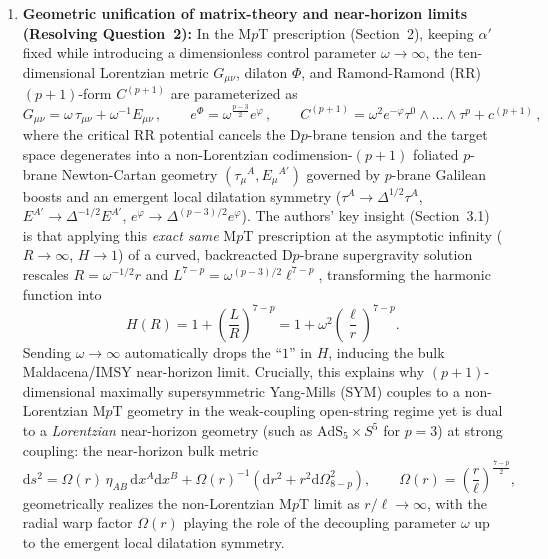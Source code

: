 \documentclass[11pt,a4paper]{article}
\newcommand{\dd}{\mathrm{d}}
\begin{document}
\begin{enumerate}[label=(\alph*), leftmargin=1.8em]
    \item \textbf{Geometric unification of matrix-theory and near-horizon limits (Resolving Question~2):}
    In the M$p$T prescription (Section~2), keeping $\alpha'$ fixed while introducing a dimensionless control parameter $\omega \to \infty$, the ten-dimensional Lorentzian metric $G_{\mu\nu}$, dilaton $\Phi$, and Ramond-Ramond (RR) $(p+1)$-form $C^{(p+1)}$ are parameterized as
    \begin{equation}
        G_{\mu\nu} = \omega\,\tau_{\mu\nu} + \omega^{-1} E_{\mu\nu}\,, \qquad
        e^\Phi = \omega^{\frac{p-3}{2}} e^\varphi\,, \qquad
        C^{(p+1)} = \omega^2 e^{-\varphi} \tau^0 \wedge \dots \wedge \tau^p + c^{(p+1)}\,,
        \label{eq:MpT_def}
    \end{equation}
    where the critical RR potential cancels the D$p$-brane tension and the target space degenerates into a non-Lorentzian codimension-$(p+1)$ foliated $p$-brane Newton-Cartan geometry $(\tau_\mu{}^A, E_\mu{}^{A'})$ governed by $p$-brane Galilean boosts and an emergent local dilatation symmetry ($\tau^A \to \Delta^{1/2}\tau^A$, $E^{A'} \to \Delta^{-1/2}E^{A'}$, $e^\varphi \to \Delta^{(p-3)/2}e^\varphi$). The authors' key insight (Section~3.1) is that applying this \emph{exact same} M$p$T prescription at the asymptotic infinity ($R \to \infty$, $H \to 1$) of a curved, backreacted D$p$-brane supergravity solution rescales $R = \omega^{-1/2}r$ and $L^{7-p} = \omega^{(p-3)/2}\ell^{7-p}$, transforming the harmonic function into
    \begin{equation}
        H(R) = 1 + \left(\frac{L}{R}\right)^{\!7-p} = 1 + \omega^2 \left(\frac{\ell}{r}\right)^{\!7-p}.
    \end{equation}
    Sending $\omega \to \infty$ automatically drops the ``$1$'' in $H$, inducing the bulk Maldacena/IMSY near-horizon limit. Crucially, this explains why $(p+1)$-dimensional maximally supersymmetric Yang-Mills (SYM) couples to a non-Lorentzian M$p$T geometry in the weak-coupling open-string regime yet is dual to a \emph{Lorentzian} near-horizon geometry (such as $\text{AdS}_5 \times S^5$ for $p=3$) at strong coupling: the near-horizon bulk metric
    \begin{equation}
        \dd s^2 = \mathbb{\Omega}(r)\,\eta_{AB}\,\dd x^A \dd x^B + \mathbb{\Omega}(r)^{-1}\left(\dd r^2 + r^2 \dd\Omega_{8-p}^2\right), \qquad \mathbb{\Omega}(r) = \left(\frac{r}{\ell}\right)^{\!\frac{7-p}{2}},
        \label{eq:NH_metric}
    \end{equation}
    geometrically realizes the non-Lorentzian M$p$T limit as $r/\ell \to \infty$, with the radial warp factor $\mathbb{\Omega}(r)$ playing the role of the decoupling parameter $\omega$ up to the emergent local dilatation symmetry.


\end{enumerate}
\end{document}
